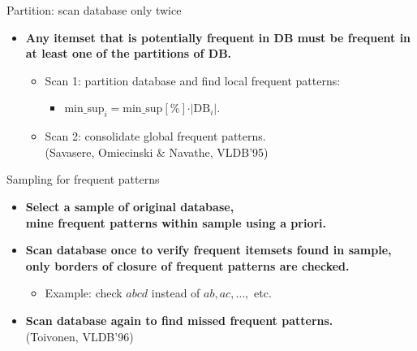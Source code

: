 \documentclass[aspectratio=169,t,xcolor=dvipsnames]{beamer}
\begin{document}
  {
    \begin{frame}{Partition: scan database only twice}
    \begin{itemize}
      \item \textbf{Any itemset that is potentially frequent in DB must be frequent in at least one of the partitions of DB.}
      \begin{itemize}
        \item Scan 1: partition database and find local frequent patterns:
        \begin{itemize}
          \item $\text{min\_sup}_i = \text{min\_sup}[\%] \cdot \vert \text{DB}_i \vert$.
        \end{itemize}
        \item Scan 2: consolidate global frequent patterns.\\
              (Savasere, Omiecinski \& Navathe, VLDB'95)
      \end{itemize}
      \vspace{0.5cm}
    \end{itemize}
    \centering
    \end{frame}
  }

  {
    \begin{frame}{Sampling for frequent patterns}
    \begin{itemize}
      \item \textbf{Select a sample of original database,\\
       mine frequent patterns within sample using a priori.}
      \item \textbf{Scan database once to verify frequent itemsets found in sample,\\
       only {\color{airforceblue}borders} of closure of frequent patterns are checked.}
      \begin{itemize}
        \item Example: check $abcd$ instead of $ab, ac, \ldots,$ etc.
      \end{itemize}
      \item \textbf{Scan database again to find missed frequent patterns.}\\
      (Toivonen, VLDB'96)
    \end{itemize}
    \end{frame}
  }
\end{document}

